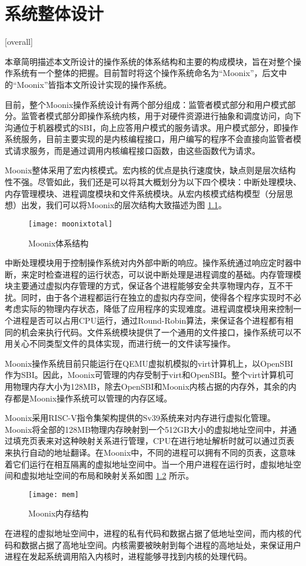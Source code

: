 
\chapter{系统整体设计}[overall]
\label{chapter:overall}

本章简明描述本文所设计的操作系统的体系结构和主要的构成模块，旨在对整个操作系统有一个整体的把握。目前暂时将这个操作系统命名为“Moonix”，后文中的“Moonix”皆指本文所设计实现的操作系统。

目前，整个Moonix操作系统设计有两个部分组成：监管者模式部分和用户模式部分。监管者模式部分即操作系统内核，用于对硬件资源进行抽象和调度访问，向下沟通位于机器模式的SBI，向上应答用户模式的服务请求。用户模式部分，即操作系统服务，目前主要实现的是内核编程接口，用户编写的程序不会直接向监管者模式请求服务，而是通过调用内核编程接口函数，由这些函数代为请求。

Moonix整体采用了宏内核模式。宏内核的优点是执行速度快，缺点则是层次结构性不强。尽管如此，我们还是可以将其大概划分为以下四个模块：中断处理模块、内存管理模块、进程调度模块和文件系统模块。从宏内核模式结构模型（分层思想）出发，我们可以将Moonix的层次结构大致描述为图 \ref{pic:moonixtotal}。

\begin{figure}[htpb]
	\centering
	\texttt{[image: moonixtotal]}
	\setlength{\abovecaptionskip}{2pt}
	\caption{Moonix体系结构}
	\label{pic:moonixtotal}
\end{figure}

中断处理模块用于控制操作系统对内外部中断的响应。操作系统通过响应定时器中断，来定时检查进程的运行状态，可以说中断处理是进程调度的基础。内存管理模块主要通过虚拟内存管理的方式，保证各个进程能够安全共享物理内存，互不干扰。同时，由于各个进程都运行在独立的虚拟内存空间，使得各个程序实现时不必考虑实际的物理内存状态，降低了应用程序的实现难度。进程调度模块用来控制一个进程是否可以占用CPU运行，通过Round-Robin算法\cite{DBLP:journals/eor/RasmussenT08}，来保证各个进程都有相同的机会来执行代码。文件系统模块提供了一个通用的文件接口，操作系统可以不用关心不同类型文件的具体实现，而进行统一的文件读写操作。

Moonix操作系统目前只能运行在QEMU虚拟机模拟的virt计算机上\cite{qemu/virt}，以OpenSBI作为SBI。因此，Moonix可管理的内存受制于virt和OpenSBI。整个virt计算机可用物理内存大小为128MB，除去OpenSBI和Moonix内核占据的内存外，其余的内存都是Moonix操作系统可以管理的内存区域。

Moonix采用RISC-V指令集架构提供的Sv39系统来对内存进行虚拟化管理。Moonix将全部的128MB物理内存映射到一个512GB大小的虚拟地址空间中，并通过填充页表来对这种映射关系进行管理，CPU在进行地址解析时就可以通过页表来执行自动的地址翻译。在Moonix中，不同的进程可以拥有不同的页表，这意味着它们运行在相互隔离的虚拟地址空间中。当一个用户进程在运行时，虚拟地址空间和虚拟地址空间的布局和映射关系如图 \ref{pic:moonixmem} 所示。

\begin{figure}[htpb]
	\centering
	\texttt{[image: mem]}
	\setlength{\abovecaptionskip}{2pt}
	\caption{Moonix内存结构}
	\label{pic:moonixmem}
\end{figure}

在进程的虚拟地址空间中，进程的私有代码和数据占据了低地址空间，而内核的代码和数据占据了高地址空间。内核需要被映射到每个进程的高地址处，来保证用户进程在发起系统调用陷入内核时，进程能够寻找到内核的处理代码。